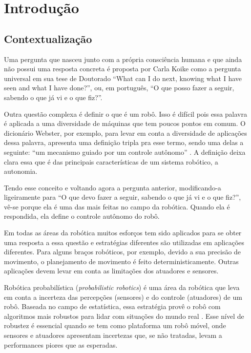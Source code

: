 
\chapter{Introdução} \label{Chap:Intro}


\section{Contextualização}

Uma pergunta que nasceu junto com a própria consciência humana e que ainda não possui uma resposta concreta é proposta por Carla Koike como a pergunta universal em sua tese de Doutorado \cite{Koike:2005} ``What can I do next, knowing what I have seen and what I have done?'', ou, em português, ``O que posso fazer a seguir, sabendo o que já vi e o que fiz?''.

Outra questão complexa é definir o que é um robô. Isso é difícil pois essa palavra é aplicada a uma diversidade de máquinas que tem poucos pontos em comum. O dicionário Webster, por exemplo, para levar em conta a diversidade de aplicações dessa palavra, apresenta uma definição tripla pra esse termo, sendo uma delas a seguinte: “um mecanismo guiado por um controle autônomo” \cite{Fievet_2002}. A definição deixa clara essa que é das principais características de um sistema robótico, a autonomia.

Tendo esse conceito e voltando agora a pergunta anterior, modificando-a ligeiramente para “O que devo fazer a seguir, sabendo o que já vi e o que fiz?”, vê-se porque ela é uma das mais feitas no campo da robótica. Quando ela é respondida, ela define o controle autônomo do robô.

Em todas as áreas da robótica muitos esforços tem sido aplicados para se obter uma resposta a essa questão e estratégias diferentes são utilizadas em aplicações diferentes. Para alguns braços robóticos, por exemplo, devido a sua precisão de movimento, o planejamento de movimento é feito deterministicamente. Outras aplicações devem levar em conta as limitações dos atuadores e sensores.

Robótica probabilística (\textit{probabilistic robotics}) é uma área da robótica que leva em conta a incerteza das percepções (sensores) e do controle (atuadores) de um robô. Baseada no campo de estatística, essa estratégia provê o robô com algoritmos mais robustos para lidar com situações do mundo real \cite{Thrun:2005:PR:1121596}. Esse nível de robustez é essencial quando se tem como plataforma um robô móvel, onde sensores e atuadores apresentam incertezas que, se não tratadas, levam a performances piores que as esperadas.

